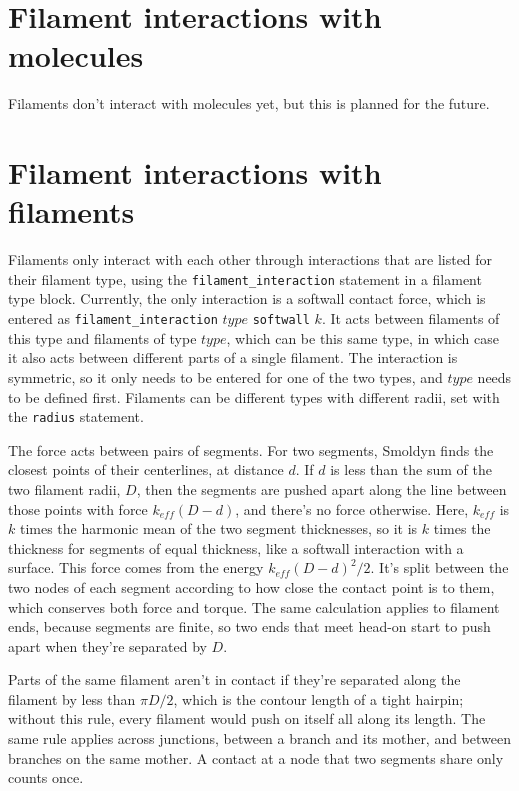 \documentclass {scrbook}
\newcommand {\ttt} {\texttt}
\begin{document}
\section{Filament interactions with molecules}

Filaments don't interact with molecules yet, but this is planned for the future.

\section{Filament interactions with filaments}
\label{sec:FilFilInteractions}

Filaments only interact with each other through interactions that are listed for their filament type, using the \ttt{filament\_interaction} statement in a filament type block. Currently, the only interaction is a softwall contact force, which is entered as \ttt{filament\_interaction} $type$ \ttt{softwall} $k$. It acts between filaments of this type and filaments of type $type$, which can be this same type, in which case it also acts between different parts of a single filament. The interaction is symmetric, so it only needs to be entered for one of the two types, and $type$ needs to be defined first. Filaments can be different types with different radii, set with the \ttt{radius} statement.

The force acts between pairs of segments. For two segments, Smoldyn finds the closest points of their centerlines, at distance $d$. If $d$ is less than the sum of the two filament radii, $D$, then the segments are pushed apart along the line between those points with force $k_{eff}(D-d)$, and there's no force otherwise. Here, $k_{eff}$ is $k$ times the harmonic mean of the two segment thicknesses, so it is $k$ times the thickness for segments of equal thickness, like a softwall interaction with a surface. This force comes from the energy $k_{eff}(D-d)^2/2$. It's split between the two nodes of each segment according to how close the contact point is to them, which conserves both force and torque. The same calculation applies to filament ends, because segments are finite, so two ends that meet head-on start to push apart when they're separated by $D$.

Parts of the same filament aren't in contact if they're separated along the filament by less than $\pi D/2$, which is the contour length of a tight hairpin; without this rule, every filament would push on itself all along its length. The same rule applies across junctions, between a branch and its mother, and between branches on the same mother. A contact at a node that two segments share only counts once.
\end{document}
